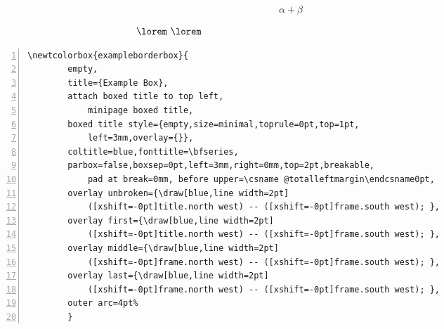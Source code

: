 \documentclass{article}
\begin{document}
    \begin{mdframed}
        \[ \alpha + \beta \]
    \end{mdframed}

    \begin{mdframed}
        \[ \vcenter{
\lorem \lorem
        } \]
    \end{mdframed}


    \begin{exampleborderbox}
    \lorem
    \begin{lstlisting}[backgroundcolor=\color{backcolor},numbers=left,gobble=4,numbersep=3pt,xleftmargin=5pt,lineskip=-.7ex,alsoletter=\\]
        \newtcolorbox{exampleborderbox}{
        empty,
        title={Example Box},
        attach boxed title to top left,
            minipage boxed title,
        boxed title style={empty,size=minimal,toprule=0pt,top=1pt,
            left=3mm,overlay={}},
        coltitle=blue,fonttitle=\bfseries,
        parbox=false,boxsep=0pt,left=3mm,right=0mm,top=2pt,breakable,
            pad at break=0mm, before upper=\csname @totalleftmargin\endcsname0pt, 
        overlay unbroken={\draw[blue,line width=2pt] 
            ([xshift=-0pt]title.north west) -- ([xshift=-0pt]frame.south west); },
        overlay first={\draw[blue,line width=2pt] 
            ([xshift=-0pt]title.north west) -- ([xshift=-0pt]frame.south west); },
        overlay middle={\draw[blue,line width=2pt] 
            ([xshift=-0pt]frame.north west) -- ([xshift=-0pt]frame.south west); },
        overlay last={\draw[blue,line width=2pt] 
            ([xshift=-0pt]frame.north west) -- ([xshift=-0pt]frame.south west); },
        outer arc=4pt%
        }
    \end{lstlisting}
    \begin{mdframed}
        \lorem \lorem
    \end{mdframed}
    \end{exampleborderbox}
\end{document}
